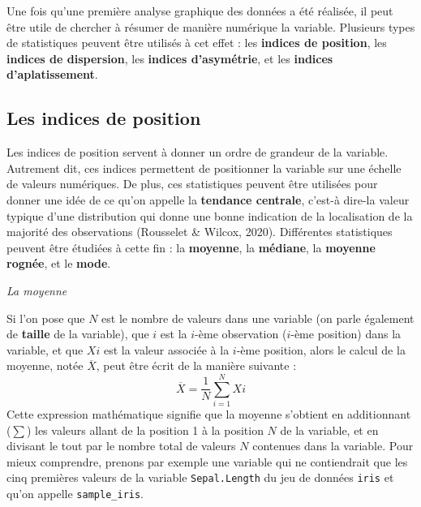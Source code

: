 \documentclass[
  letterpaper,
]{book}
\newenvironment{Shaded}{\begin{snugshade}}{\end{snugshade}}
\newcommand{\DecValTok}[1]{\textcolor[rgb]{0.68,0.00,0.00}{#1}}
\newcommand{\NormalTok}[1]{\textcolor[rgb]{0.00,0.23,0.31}{#1}}
\newcommand{\OtherTok}[1]{\textcolor[rgb]{0.00,0.23,0.31}{#1}}
\newcommand{\SpecialCharTok}[1]{\textcolor[rgb]{0.37,0.37,0.37}{#1}}
\begin{document}
Une fois qu'une première analyse graphique des données a été réalisée,
il peut être utile de chercher à résumer de manière numérique la
variable. Plusieurs types de statistiques peuvent être utilisés à cet
effet : les \textbf{indices de position}, les \textbf{indices de
dispersion}, les \textbf{indices d'asymétrie}, et les \textbf{indices
d'aplatissement}.

\subsection{Les indices de position}\label{les-indices-de-position}

Les indices de position servent à donner un ordre de grandeur de la
variable. Autrement dit, ces indices permettent de positionner la
variable sur une échelle de valeurs numériques. De plus, ces
statistiques peuvent être utilisées pour donner une idée de ce qu'on
appelle la \textbf{tendance centrale}, c'est-à dire-la valeur typique
d'une distribution qui donne une bonne indication de la localisation de
la majorité des observations (Rousselet \& Wilcox, 2020). Différentes
statistiques peuvent être étudiées à cette fin : la \textbf{moyenne}, la
\textbf{médiane}, la \textbf{moyenne rognée}, et le \textbf{mode}.

\emph{La moyenne}

Si l'on pose que \(N\) est le nombre de valeurs dans une variable (on
parle également de \textbf{taille} de la variable), que \(i\) est la
\(i\)-ème observation (\(i\)-ème position) dans la variable, et que
\(X{i}\) est la valeur associée à la \(i\)-ème position, alors le calcul
de la moyenne, notée \(\overline{X}\), peut être écrit de la manière
suivante : \[\overline{X} = \frac{1}{N}\sum_{i=1}^{N} X{i}\] Cette
expression mathématique signifie que la moyenne s'obtient en
additionnant (\(\sum\)) les valeurs allant de la position 1 à la
position \(N\) de la variable, et en divisant le tout par le nombre
total de valeurs \(N\) contenues dans la variable. Pour mieux
comprendre, prenons par exemple une variable qui ne contiendrait que les
cinq premières valeurs de la variable \texttt{Sepal.Length} du jeu de
données \texttt{iris} et qu'on appelle \texttt{sample\_iris}.

\begin{Shaded}
\end{Shaded}
\end{document}
